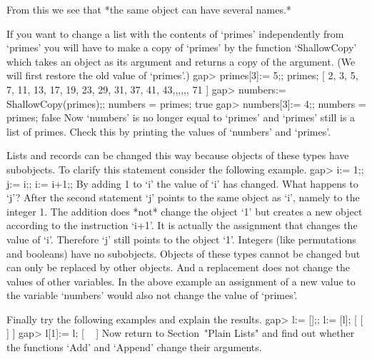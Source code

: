 From this we see that *the same object can have several names.*

If you want to change a list with the  contents of `primes' independently
from `primes'  you will have to  make a copy of  `primes' by the function
`ShallowCopy' which takes an object as its argument and returns a copy of
the argument. (We will first restore the old value of `primes'.)
\beginexample
gap> primes[3]:= 5;; primes;
[ 2, 3, 5, 7, 11, 13, 17, 19, 23, 29, 31, 37, 41, 43,,,,,, 71 ]
gap> numbers:= ShallowCopy(primes);; numbers = primes;
true
gap> numbers[3]:= 4;; numbers = primes;
false
\endexample
Now `numbers' is no longer equal to `primes' and `primes' still is a list
of primes.  Check this by printing the values of `numbers' and `primes'.

Lists and records can be changed this way because {\GAP} objects of these
types have subobjects.
To clarify this statement consider the following example.
\beginexample
gap> i:= 1;; j:= i;; i:= i+1;; 
\endexample
By adding 1 to `i' the value of `i' has  changed.   What  happens to `j'?
After the second statement `j' points to the same object  as `i',  namely
to the  integer 1.  The  addition  does *not* change  the object `1'  but
creates a new object according  to the instruction `i+1'.  It is actually
the assignment that changes the value of `i'.  Therefore `j' still points
to  the object `1'.  Integers  (like permutations and  booleans)  have no
subobjects.  Objects  of these types  cannot  be  changed but can only be
replaced by other objects.   And a replacement does not change the values
of other variables.  In the above example an assignment of a new value to
the variable `numbers' would also not change the value of `primes'.

Finally try the following examples and explain the results.
\beginexample
gap> l:= [];; l:= [l];
[ [  ] ]
gap> l[1]:= l;
[ ~ ]
\endexample
Now return to Section~"Plain Lists" and find out whether the functions
`Add' and `Append' change their arguments.


